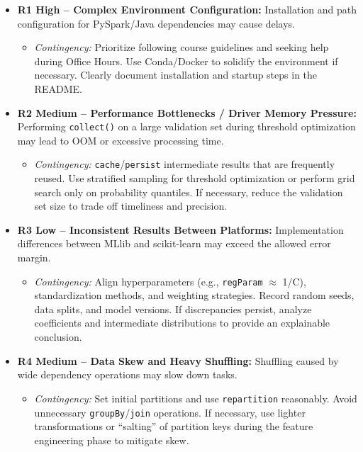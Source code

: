 \documentclass[sigplan,screen]{acmart}
\begin{document}
\begin{itemize}
\item \textbf{R1 High -- Complex Environment Configuration:} Installation and path configuration for PySpark/Java dependencies may cause delays.
\begin{itemize}
\item \textit{Contingency:} Prioritize following course guidelines and seeking help during Office Hours. Use Conda/Docker to solidify the environment if necessary. Clearly document installation and startup steps in the README.
\end{itemize}
\item \textbf{R2 Medium -- Performance Bottlenecks / Driver Memory Pressure:} Performing \texttt{collect()} on a large validation set during threshold optimization may lead to OOM or excessive processing time.
\begin{itemize}
\item \textit{Contingency:} \texttt{cache}/\texttt{persist} intermediate results that are frequently reused. Use stratified sampling for threshold optimization or perform grid search only on probability quantiles. If necessary, reduce the validation set size to trade off timeliness and precision.
\end{itemize}
\item \textbf{R3 Low -- Inconsistent Results Between Platforms:} Implementation differences between MLlib and scikit-learn may exceed the allowed error margin.
\begin{itemize}
\item \textit{Contingency:} Align hyperparameters (e.g., \texttt{regParam} $\approx$ 1/C), standardization methods, and weighting strategies. Record random seeds, data splits, and model versions. If discrepancies persist, analyze coefficients and intermediate distributions to provide an explainable conclusion.
\end{itemize}
\item \textbf{R4 Medium -- Data Skew and Heavy Shuffling:} Shuffling caused by wide dependency operations may slow down tasks.
\begin{itemize}
\item \textit{Contingency:} Set initial partitions and use \texttt{repartition} reasonably. Avoid unnecessary \texttt{groupBy}/\texttt{join} operations. If necessary, use lighter transformations or ``salting'' of partition keys during the feature engineering phase to mitigate skew.
\end{itemize}
\end{itemize}
\end{document}
